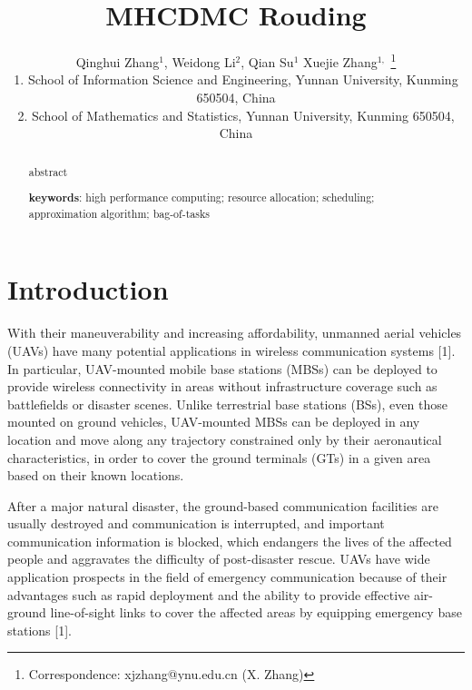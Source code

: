 \documentclass[11pt,a4paper]{article}
\title{MHCDMC Rouding}
\author{Qinghui Zhang$^1$, Weidong Li$^2$, Qian Su$^1$ Xuejie Zhang$^{1,}$ \thanks{Correspondence: xjzhang@ynu.edu.cn (X. Zhang)}\\
{\small 1. School of Information Science and Engineering, Yunnan University, Kunming 650504,  China}\\
{\small 2. School of Mathematics and Statistics,  Yunnan University, Kunming 650504, China}}
\begin{document}
\maketitle


\begin{abstract}
abstract

{\bf keywords}: high performance computing; resource allocation;
scheduling; approximation algorithm; bag-of-tasks
\end{abstract}
\newpage
\section{Introduction}


With their maneuverability and increasing affordability, unmanned aerial vehicles (UAVs) have many potential applications in wireless communication systems [1]. In particular, UAV-mounted mobile base stations (MBSs) can be deployed to provide wireless connectivity in areas without infrastructure coverage such as battlefields or disaster scenes. Unlike terrestrial base stations (BSs), even those mounted on ground vehicles, UAV-mounted MBSs can be deployed in any location and move along any trajectory constrained only by their aeronautical characteristics, in order to cover the ground terminals (GTs) in a given area based on their known locations.

After a major natural disaster, the ground-based communication facilities are usually destroyed and communication is interrupted, and important communication information is blocked, which endangers the lives of the affected people and aggravates the difficulty of post-disaster rescue. UAVs have wide application prospects in the field of emergency communication because of their advantages such as rapid deployment and the ability to provide effective air-ground line-of-sight links to cover the affected areas by equipping emergency base stations [1].
\end{document}
